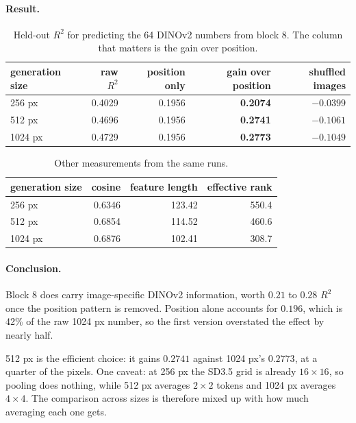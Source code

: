 \documentclass[11pt]{article}
\newcommand{\good}[1]{\textcolor{green!45!black}{#1}}
\begin{document}
\paragraph{Result.}

\begin{table}[h]
\centering
\caption{Held-out $R^2$ for predicting the 64 DINOv2 numbers from block 8. The column that matters
is the gain over position.}
\begin{tabular}{@{}lrrrr@{}}
\toprule
generation size & raw $R^2$ & position only & \textbf{gain over position} & shuffled images \\
\midrule
256 px  & 0.4029 & 0.1956 & \good{\textbf{0.2074}} & $-0.0399$ \\
512 px  & 0.4696 & 0.1956 & \good{\textbf{0.2741}} & $-0.1061$ \\
1024 px & 0.4729 & 0.1956 & \good{\textbf{0.2773}} & $-0.1049$ \\
\bottomrule
\end{tabular}
\end{table}

\begin{table}[h]
\centering
\caption{Other measurements from the same runs.}
\begin{tabular}{@{}lrrr@{}}
\toprule
generation size & cosine & feature length & effective rank \\
\midrule
256 px  & 0.6346 & 123.42 & 550.4 \\
512 px  & 0.6854 & 114.52 & 460.6 \\
1024 px & 0.6876 & 102.41 & 308.7 \\
\bottomrule
\end{tabular}
\end{table}

\paragraph{Conclusion.} Block 8 does carry image-specific DINOv2 information, worth $0.21$ to $0.28$
$R^2$ once the position pattern is removed. Position alone accounts for $0.196$, which is 42\% of the
raw 1024 px number, so the first version overstated the effect by nearly half.

512 px is the efficient choice: it gains $0.2741$ against 1024 px's $0.2773$, at a quarter of the
pixels. One caveat: at 256 px the SD3.5 grid is already $16\times16$, so pooling does nothing, while
512 px averages $2\times2$ tokens and 1024 px averages $4\times4$. The comparison across sizes is
therefore mixed up with how much averaging each one gets.
\end{document}
